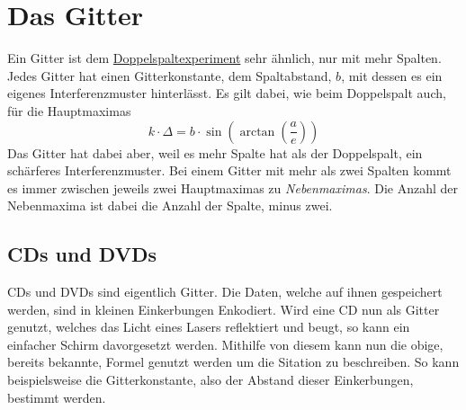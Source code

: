 \documentclass{article}
\begin{document}
\section{Das Gitter}
Ein Gitter ist dem \hyperref[Das Doppelspaltexperiment]{Doppelspaltexperiment} sehr ähnlich, nur mit mehr Spalten. Jedes Gitter hat einen Gitterkonstante, dem Spaltabstand, $b$, mit dessen es ein eigenes Interferenzmuster hinterlässt. Es gilt dabei, wie beim Doppelspalt auch, für die Hauptmaximas
\[
 k \cdot \Delta = b \cdot \sin{\left(\arctan{\left(\frac{a}{e}\right)}\right)}
\]
Das Gitter hat dabei aber, weil es mehr Spalte hat als der Doppelspalt, ein schärferes Interferenzmuster. Bei einem Gitter mit mehr als zwei Spalten kommt es immer zwischen jeweils zwei Hauptmaximas zu \emph{Nebenmaximas}. Die Anzahl der Nebenmaxima ist dabei die Anzahl der Spalte, minus zwei.
 
\subsection{CDs und DVDs} 
\begin{minipage}{\dimexpr\linewidth-4cm}
CDs und DVDs sind eigentlich Gitter. Die Daten, welche auf ihnen gespeichert werden, sind in kleinen Einkerbungen Enkodiert. Wird eine CD nun als Gitter genutzt, welches das Licht eines Lasers reflektiert und beugt, so kann ein einfacher Schirm davorgesetzt werden. Mithilfe von diesem kann nun die obige, bereits bekannte, Formel genutzt werden um die Sitation zu beschreiben. So kann beispielsweise die Gitterkonstante, also der Abstand dieser Einkerbungen, bestimmt werden.
\end{minipage}
\hfill
\begin{minipage}{4cm}
 \center
\end{minipage} 
\end{document}
